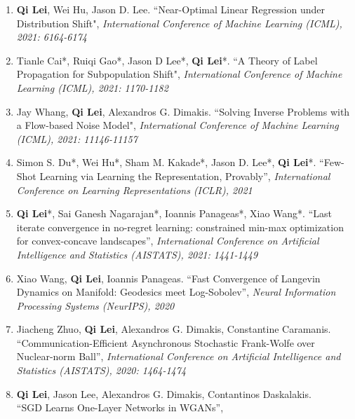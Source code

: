 \documentclass[margin, 10pt]{res} %
\begin{document}
\begin{resume}
\begin{enumerate}
	
\item{ \textbf{Qi Lei}, Wei Hu, Jason D. Lee.	
``Near-Optimal Linear Regression under Distribution Shift", \textit{ International Conference of Machine Learning (ICML), 2021: 6164-6174}
}	
\item{Tianle Cai*, Ruiqi Gao*, Jason D Lee*, \textbf{Qi Lei}*.  ``A Theory of Label Propagation for Subpopulation Shift", \textit{International Conference of Machine Learning (ICML), 2021: 1170-1182
} }
\item{Jay Whang, \textbf{Qi Lei}, Alexandros G. Dimakis. ``Solving Inverse Problems with a Flow-based Noise Model", \textit{International Conference of Machine Learning (ICML), 2021: 11146-11157
 }}
	\item{Simon S. Du*, Wei Hu*, Sham M. Kakade*, Jason D. Lee*, \textbf{Qi Lei}*. ``Few-Shot Learning via Learning the Representation, Provably'', \textit{International Conference on Learning Representations (ICLR), 2021} }
	\item{\textbf{Qi Lei}*, Sai Ganesh Nagarajan*, Ioannis Panageas*, Xiao Wang*. ``Last iterate convergence in no-regret learning: constrained min-max optimization for convex-concave landscapes'',\textit{ International Conference on
			Artificial Intelligence and Statistics (AISTATS), 2021: 1441-1449}}
	\item{ Xiao Wang, \textbf{Qi Lei}, Ioannis Panageas. ``Fast Convergence of Langevin Dynamics on Manifold: Geodesics meet Log-Sobolev'', \textit{Neural Information Processing Systems (NeurIPS), 2020 }  }
\item{Jiacheng Zhuo, \textbf{Qi Lei}, Alexandros G. Dimakis, Constantine 
      Caramanis.\\ ``Communication-Efficient Asynchronous Stochastic 
    Frank-Wolfe over Nuclear-norm Ball'', \textit{ International Conference on Artificial Intelligence and Statistics (AISTATS), 2020: 1464-1474} }
\item{\textbf{Qi Lei}, Jason Lee, Alexandros G. Dimakis, Contantinos 
  Daskalakis. \\ ``SGD Learns One-Layer Networks in WGANs'', 
}
\end{enumerate}
\end{resume}
\end{document}
